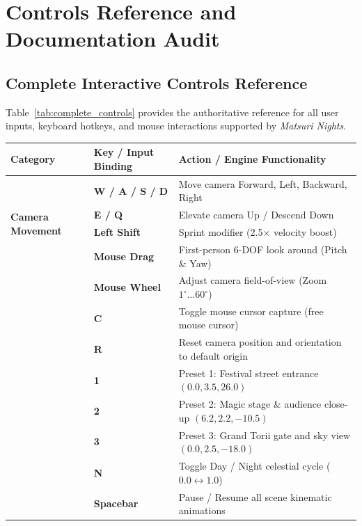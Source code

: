 \chapter{Controls Reference and Documentation Audit}
\label{chap:controls}

\section{Complete Interactive Controls Reference}
Table~\ref{tab:complete_controls} provides the authoritative reference for all user inputs, keyboard hotkeys, and mouse interactions supported by \textit{Matsuri Nights}.

\begin{table}[htbp]
\centering
\footnotesize
\renewcommand{\arraystretch}{0.92}
\begin{tabularx}{\textwidth}{p{3.2cm} p{2.8cm} p{8.4cm}}
\toprule
\textbf{Category} & \textbf{Key / Input Binding} & \textbf{Action / Engine Functionality} \\
\midrule
\multirow{4}{*}{\textbf{Camera Movement}} &
\textbf{W / A / S / D} & Move camera Forward, Left, Backward, Right \\
& \textbf{E / Q} & Elevate camera Up / Descend Down \\
& \textbf{Left Shift} & Sprint modifier (2.5$\times$ velocity boost) \\
& \textbf{Mouse Drag} & First-person 6-DOF look around (Pitch \& Yaw) \\
& \textbf{Mouse Wheel} & Adjust camera field-of-view (Zoom $1^\circ \dots 60^\circ$) \\
& \textbf{C} & Toggle mouse cursor capture (free mouse cursor) \\
& \textbf{R} & Reset camera position and orientation to default origin \\
\addlinespace
\midrule
\multirow{3}{*}{\textbf{Camera Presets}} &
\textbf{1} & Preset 1: Festival street entrance $(0.0, 3.5, 26.0)$ \\
& \textbf{2} & Preset 2: Magic stage \& audience close-up $(6.2, 2.2, -10.5)$ \\
& \textbf{3} & Preset 3: Grand Torii gate and sky view $(0.0, 2.5, -18.0)$ \\
\addlinespace
\midrule
\multirow{8}{*}{\textbf{Environment \& Shading}} &
\textbf{N} & Toggle Day / Night celestial cycle ($0.0 \leftrightarrow 1.0$) \\
& \textbf{Spacebar} & Pause / Resume all scene kinematic animations \\

\end{tabularx}
\end{table}
